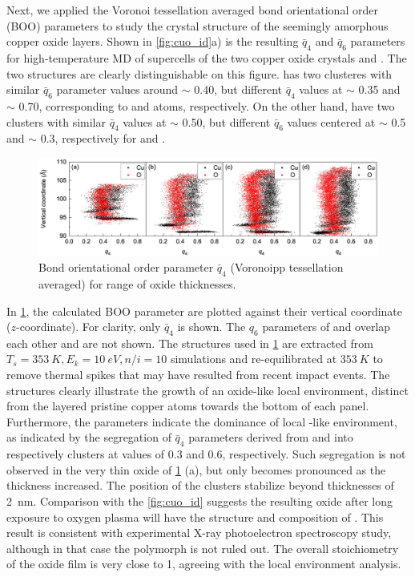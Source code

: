 \documentclass[manuscript=cmatex]{achemso}
\begin{document}
Next, we applied the Voronoi tessellation averaged bond orientational order (BOO) parameters to study the crystal structure of the seemingly amorphous copper oxide layers. Shown in \cref{fig:cuo_id}a) is the resulting $\bar{q}_4$ and $\bar{q}_6$ parameters for high-temperature MD of supercells of the two copper oxide crystals  and . The two structures are clearly distinguishable on this figure.  has two clusteres with similar $\bar{q}_6$ parameter values around $\sim$ 0.40, but different $\bar{q}_4$ values at $\sim$ 0.35 and $\sim$ 0.70, corresponding to  and  atoms, respectively. On the other hand,  have two clusters with similar $\bar{q}_4$ values at $\sim$ 0.50, but different $\bar{q}_6$ values centered at $\sim$ 0.5 and $\sim$ 0.3, respectively for  and . 
\begin{figure}[h]
  \centering
  \includegraphics[width=\textwidth]{boo_1234.eps}
  \caption[Steinhardt's order parameter for slab]{Bond orientational order parameter $\bar{q}_4$ (Voronoipp tessellation averaged) for range of oxide thicknesses. }
  \label{fig:boo_slab}
\end{figure}

In \cref{fig:boo_slab}, the calculated BOO parameter are plotted against their vertical coordinate ($z$-coordinate). For clarity, only $\bar{q}_4$ is shown. The $q_6$ parameters of  and  overlap each other and are not shown. The structures used in \cref{fig:boo_slab} are extracted from $T_s=\SI{353}{K}, E_k=\SI{10}{eV}, n/i = 10$ simulations and re-equilibrated at $\SI{353}{K}$ to remove thermal spikes that may have resulted from recent impact events. The structures clearly illustrate the growth of an oxide-like local environment, distinct from the layered pristine copper atoms towards the bottom of each panel. Furthermore, the parameters indicate the dominance of local -like environment, as indicated by the segregation of $\bar{q}_4$ parameters derived from  and  into respectively clusters at values of 0.3 and 0.6, respectively. Such segregation is not observed in the very thin oxide of \cref{fig:boo_slab} (a), but only becomes pronounced as the thickness increased. The position of the clusters stabilize beyond thicknesses of \SI{2}{nm}. Comparison with the \cref{fig:cuo_id} suggests the resulting oxide after long exposure to oxygen plasma will have the structure and composition of . This result is consistent with experimental X-ray photoelectron spectroscopy study, although in that case the  polymorph is not ruled out. The overall stoichiometry of the oxide film is very close to 1, agreeing with the local environment analysis. 
\end{document}
